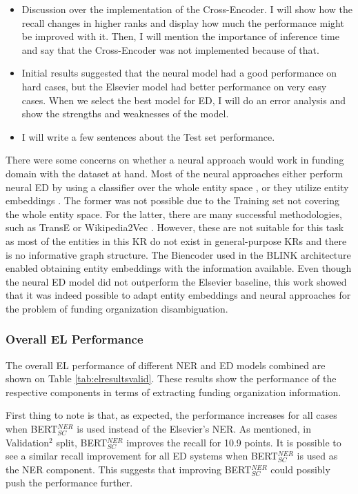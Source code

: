 \documentclass{report}
\theoremstyle{definition}
\theoremstyle{remark}
\begin{document}
\begin{itemize}
    \item Discussion over the implementation of the Cross-Encoder. I will show how the recall changes in higher ranks and display how much the performance might be improved with it. Then, I will mention the importance of inference time and say that the Cross-Encoder was not implemented because of that.
    \item Initial results suggested that the neural model had a good performance on hard cases, but the Elsevier model had better performance on very easy cases. When we select the best model for ED, I will do an error analysis and show the strengths and weaknesses of the model. 
    \item I will write a few sentences about the Test set performance.
\end{itemize}

There were some concerns on whether a neural approach would work in funding domain with the dataset at hand. Most of the neural approaches either perform neural ED by using a classifier over the whole entity space \textcolor{red}{\cite{}}, or they utilize entity embeddings \textcolor{red}{\cite{}}. The former was not possible due to the Training set not covering the whole entity space. For the latter, there are many successful methodologies, such as TransE \cite{TransE} or Wikipedia2Vec \cite{wikipedia2vec2}. However, these are not suitable for this task as most of the entities in this KR do not exist in general-purpose KRs and there is no informative graph structure. The Biencoder used in the BLINK architecture enabled obtaining entity embeddings with the information available. Even though the neural ED model did not outperform the Elsevier baseline, this work showed that it was indeed possible to adapt entity embeddings and neural approaches for the problem of funding organization disambiguation.

\subsubsection{Overall EL Performance}
The overall EL performance of different NER and ED models combined are shown on Table \ref{tab:elresultsvalid}. These results show the performance of the respective components in terms of extracting funding organization information.

First thing to note is that, as expected, the performance increases for all cases when BERT$_{SC}^{NER}$ is used instead of the Elsevier's NER. As mentioned, in Validation$^2$ split, BERT$_{SC}^{NER}$ improves the recall for 10.9 points. It is possible to see a similar recall improvement for all ED systems when BERT$_{SC}^{NER}$ is used as the NER component. This suggests that improving BERT$_{SC}^{NER}$ could possibly push the performance further. 
\end{document}
